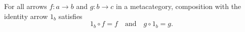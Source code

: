 For all arrows $f: a \to b$ and $g: b \to c$ in a metacategory, composition with the identity arrow $1_b$ satisfies
$$1_b \circ f = f \quad \text{and} \quad g \circ 1_b = g.$$

